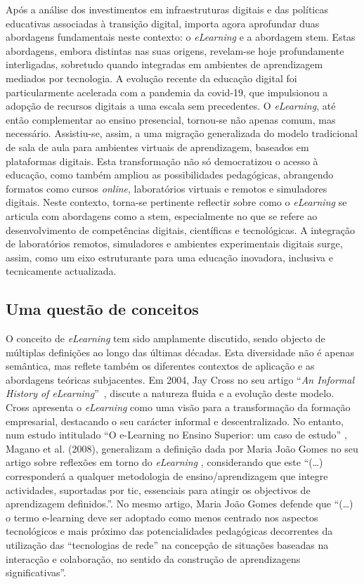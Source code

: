 Após a análise dos investimentos em infraestruturas digitais e das políticas educativas associadas à transição digital, importa agora aprofundar duas abordagens fundamentais neste contexto: o \textit{eLearning} e a abordagem \acrshort{stem}. Estas abordagens, embora distintas nas suas origens, revelam-se hoje profundamente interligadas, sobretudo quando integradas em ambientes de aprendizagem mediados por tecnologia. A evolução recente da educação digital foi particularmente acelerada com a pandemia da \acrshort{covid-19}, que impulsionou a adopção de recursos digitais a uma escala sem precedentes. O \textit{eLearning}, até então complementar ao ensino presencial, tornou-se não apenas comum, mas necessário. Assistiu-se, assim, a uma migração generalizada do modelo tradicional de sala de aula para ambientes virtuais de aprendizagem, baseados em plataformas digitais. Esta transformação não só democratizou o acesso à educação, como também ampliou as possibilidades pedagógicas, abrangendo formatos como cursos \textit{online}, laboratórios virtuais e remotos e simuladores digitais. Neste contexto, torna-se pertinente reflectir sobre como o \textit{eLearning} se articula com abordagens como a \acrshort{stem}, especialmente no que se refere ao desenvolvimento de competências digitais, científicas e tecnológicas. A integração de laboratórios remotos, simuladores e ambientes experimentais digitais surge, assim, como um eixo estruturante para uma educação inovadora, inclusiva e tecnicamente actualizada.

\subsection{Uma questão de conceitos}
O conceito de \textit{eLearning} tem sido amplamente discutido, sendo objecto de múltiplas definições ao longo das últimas décadas. Esta diversidade não é apenas semântica, mas reflete também os diferentes contextos de aplicação e as abordagens teóricas subjacentes. Em 2004, Jay Cross no seu artigo ``\textit{An Informal History of eLearning}''~\cite{jaycross}, discute a natureza fluida e a evolução deste modelo. Cross apresenta o \textit{eLearning} como uma visão para a transformação da formação empresarial, destacando o seu carácter informal e descentralizado.  No entanto, num estudo intitulado ``O e-Learning no Ensino Superior: um caso de estudo'' \cite{eLearningenssup}, Magano et al. (2008), generalizam a definição dada por Maria João Gomes no seu artigo sobre reflexões em torno do \textit{eLearning} \cite{gomes_e-learning_2005}, considerando que este ``(\ldots) corresponderá a qualquer metodologia de ensino/aprendizagem que integre actividades, suportadas por \acrshort{tic}, essenciais para atingir os objectivos de aprendizagem definidos.''. No mesmo artigo, Maria João Gomes defende que ``(\ldots) o termo e-learning deve ser adoptado como menos centrado nos aspectos tecnológicos e mais próximo das potencialidades pedagógicas decorrentes da utilização das ``tecnologias de rede'' na concepção de situações baseadas na interacção e colaboração, no sentido da construção de aprendizagens significativas''.

